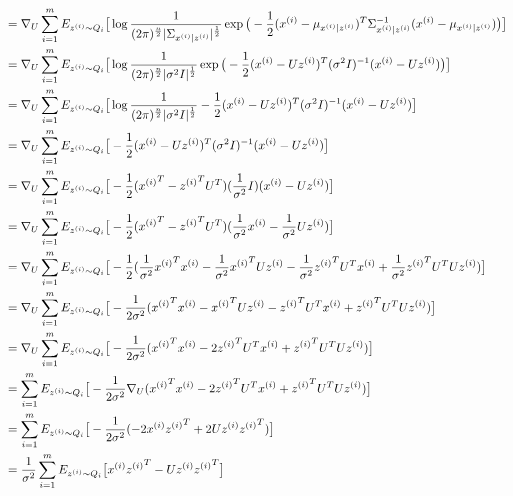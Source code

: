\documentclass[11pt]{article}
\begin{document}
\begin{align*}
    &= \nabla_U \sum_{i=1}^m E_{z^{(i)} \sim Q_i}
        \big[ \log \frac{1}{(2 \pi)^{\frac{n}{2}}|\Sigma_{x^{(i)}|z^{(i)}}|^{\frac{1}{2}}} 
              \exp \big(-\frac{1}{2}(x^{(i)} - \mu_{x^{(i)}|z^{(i)}})^T \Sigma_{x^{(i)}|z^{(i)}}^{-1} (x^{(i)} - \mu_{x^{(i)}|z^{(i)}}) \big) \big] \\
    &= \nabla_U \sum_{i=1}^m E_{z^{(i)} \sim Q_i}
        \big[ \log \frac{1}{(2 \pi)^{\frac{n}{2}}|\sigma^2 I|^{\frac{1}{2}}} 
              \exp \big(-\frac{1}{2}(x^{(i)} - Uz^{(i)})^T (\sigma^2 I)^{-1} (x^{(i)} - Uz^{(i)}) \big) \big] \\
    &= \nabla_U \sum_{i=1}^m E_{z^{(i)} \sim Q_i}
        \big[ \log \frac{1}{(2 \pi)^{\frac{n}{2}}|\sigma^2 I|^{\frac{1}{2}}} 
              -\frac{1}{2}(x^{(i)} - Uz^{(i)})^T (\sigma^2 I)^{-1} (x^{(i)} - Uz^{(i)}) \big] \\
    &= \nabla_U \sum_{i=1}^m E_{z^{(i)} \sim Q_i}
        \big[ -\frac{1}{2}(x^{(i)} - Uz^{(i)})^T (\sigma^2 I)^{-1} (x^{(i)} - Uz^{(i)}) \big] \\
    &= \nabla_U \sum_{i=1}^m E_{z^{(i)} \sim Q_i}
        \big[ -\frac{1}{2}({x^{(i)}}^T - {z^{(i)}}^T U^T) (\frac{1}{\sigma^2}I) (x^{(i)} - Uz^{(i)}) \big] \\
    &= \nabla_U \sum_{i=1}^m E_{z^{(i)} \sim Q_i}
        \big[ -\frac{1}{2}({x^{(i)}}^T - {z^{(i)}}^T U^T) (\frac{1}{\sigma^2} x^{(i)} - \frac{1}{\sigma^2} Uz^{(i)}) \big] \\
    &= \nabla_U \sum_{i=1}^m E_{z^{(i)} \sim Q_i}
        \big[ -\frac{1}{2}(\frac{1}{\sigma^2} {x^{(i)}}^T x^{(i)} - \frac{1}{\sigma^2} {x^{(i)}}^T U z^{(i)} - \frac{1}{\sigma^2} {z^{(i)}}^T U^T x^{(i)} + \frac{1}{\sigma^2} {z^{(i)}}^T U^T U z^{(i)}) \big] \\
    &= \nabla_U \sum_{i=1}^m E_{z^{(i)} \sim Q_i}
        \big[ -\frac{1}{2 \sigma^2}({x^{(i)}}^T x^{(i)} - {x^{(i)}}^T U z^{(i)} - {z^{(i)}}^T U^T x^{(i)} + {z^{(i)}}^T U^T U z^{(i)}) \big] \\
    &= \nabla_U \sum_{i=1}^m E_{z^{(i)} \sim Q_i}
        \big[ -\frac{1}{2 \sigma^2}({x^{(i)}}^T x^{(i)} - 2 {z^{(i)}}^T U^T x^{(i)} + {z^{(i)}}^T U^T U z^{(i)}) \big] \\
    &= \sum_{i=1}^m E_{z^{(i)} \sim Q_i}
        \big[ -\frac{1}{2 \sigma^2} \nabla_U ({x^{(i)}}^T x^{(i)} - 2 {z^{(i)}}^T U^T x^{(i)} + {z^{(i)}}^T U^T U z^{(i)}) \big] \\
    &= \sum_{i=1}^m E_{z^{(i)} \sim Q_i}
        \big[ -\frac{1}{2 \sigma^2} (-2 x^{(i)} {z^{(i)}}^T + 2 U z^{(i)} {z^{(i)}}^T) \big] \\
    &= \frac{1}{\sigma^2} \sum_{i=1}^m E_{z^{(i)} \sim Q_i}
        \big[x^{(i)} {z^{(i)}}^T - U z^{(i)} {z^{(i)}}^T \big] \\
\end{align*}
\end{document}
